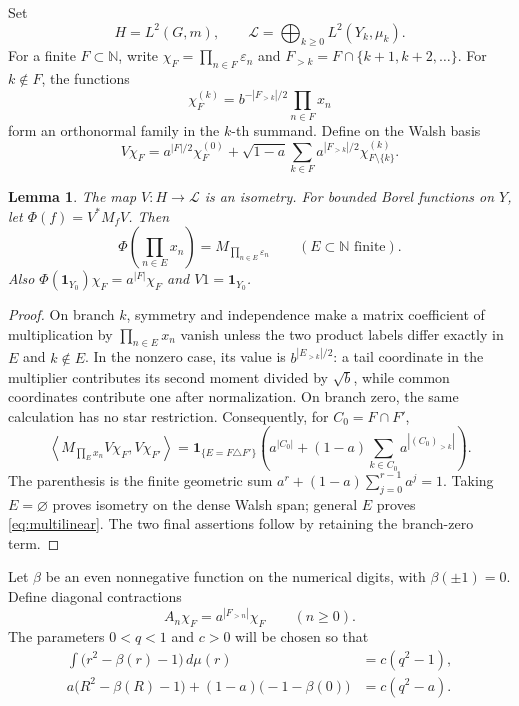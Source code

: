 \documentclass[11pt,letterpaper]{amsart}
\newtheorem{lemma}[theorem]{Lemma}
\theoremstyle{definition}
\theoremstyle{remark}
\numberwithin{equation}{section}
\begin{document}
Set
\[
 H=L^2(G,m),\qquad
 \mathcal L=\bigoplus_{k\ge0}L^2(Y_k,\mu_k).
\]
For a finite \(F\subset\mathbb N\), write
\(\chi_F=\prod_{n\in F}\varepsilon_n\) and
\(F_{>k}=F\cap\{k+1,k+2,\ldots\}\).
For \(k\notin F\), the functions
\[
                  \chi_F^{(k)}
        =b^{-|F_{>k}|/2}\prod_{n\in F}x_n
\]
form an orthonormal family in the \(k\)-th summand.
Define on the Walsh basis
\begin{equation}\label{eq:V}
 V\chi_F=a^{|F|/2}\chi_F^{(0)}
       +\sqrt{1-a}\sum_{k\in F}
            a^{|F_{>k}|/2}\chi_{F\setminus\{k\}}^{(k)}.
\end{equation}

\begin{lemma}\label{lem:walsh}
The map \(V:H\to\mathcal L\) is an isometry. For bounded Borel
functions on \(Y\), let \(\Phi(f)=V^*M_fV\). Then
\begin{equation}\label{eq:multilinear}
 \Phi\left(\prod_{n\in E}x_n\right)
                  =M_{\prod_{n\in E}\varepsilon_n}
              \qquad(E\subset\mathbb N\text{ finite}).
\end{equation}
Also \(\Phi(\mathbf1_{Y_0})\chi_F=a^{|F|}\chi_F\) and
\(V1=\mathbf1_{Y_0}\).
\end{lemma}
\begin{proof}
On branch \(k\), symmetry and independence make a matrix coefficient
of multiplication by \(\prod_{n\in E}x_n\) vanish unless the two
product labels differ exactly in \(E\) and \(k\notin E\).
In the nonzero case, its value is \(b^{|E_{>k}|/2}\): a tail
coordinate in the multiplier contributes its second moment
divided by \(\sqrt b\), while common coordinates contribute one
after normalization. On branch zero, the same calculation has no
star restriction. Consequently, for \(C_0=F\cap F'\),
\[
 \left\langle M_{\prod_E x_n}V\chi_F,V\chi_{F'}\right\rangle
 =\mathbf1_{\{E=F\triangle F'\}}
 \left(a^{|C_0|}+(1-a)\sum_{k\in C_0}a^{|(C_0)_{>k}|}\right).
\]
The parenthesis is the finite geometric sum
\(a^r+(1-a)\sum_{j=0}^{r-1}a^j=1\).
Taking \(E=\varnothing\) proves isometry on the dense Walsh span;
general \(E\) proves \eqref{eq:multilinear}.
The two final assertions follow by retaining the branch-zero term.
\end{proof}

Let \(\beta\) be an even nonnegative function on the numerical
digits, with \(\beta(\pm1)=0\). Define diagonal contractions
\[
                  A_n\chi_F=a^{|F_{>n}|}\chi_F\qquad(n\ge0).
\]
The parameters \(0<q<1\) and \(c>0\) will be chosen so that
\begin{equation}\label{eq:conditions}
 \begin{aligned}
 \int\bigl(r^2-\beta(r)-1\bigr)\,d\mu(r)
                                      &=c(q^2-1),\\
 a\bigl(R^2-\beta(R)-1\bigr)
       +(1-a)\bigl(-1-\beta(0)\bigr)&=c(q^2-a).
 \end{aligned}
\end{equation}
\end{document}
